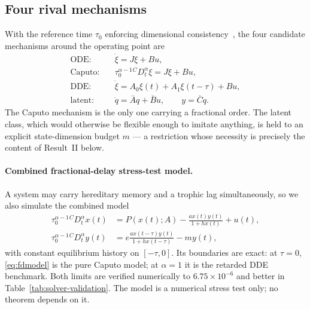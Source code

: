 \subsection{Four rival mechanisms}
With the reference time $\tau_0$ enforcing dimensional consistency~\cite{F02,F03,F04}, the four candidate mechanisms around the operating point are
\begin{align*}
\text{ODE:}&\quad \dot\xi=J\xi+Bu,\\
\text{Caputo:}&\quad \tau_0^{\alpha-1}{}^CD_t^\alpha\xi=J\xi+Bu,\\
\text{DDE:}&\quad \dot\xi=A_0\xi(t)+A_1\xi(t-\tau)+Bu,\\
\text{latent:}&\quad \dot q=\bar A q+\bar Bu,\qquad y=\bar Cq.
\end{align*}
The Caputo mechanism is the only one carrying a fractional order. The latent class, which would otherwise be flexible enough to imitate anything, is held to an explicit state-dimension budget $m$ --- a restriction whose necessity is precisely the content of Result~II below.

\paragraph{Combined fractional-delay stress-test model.}
A system may carry hereditary memory and a trophic lag simultaneously, so we also simulate the combined model
\begin{align}
\tau_0^{\alpha-1}{}^CD_t^\alpha x(t)
&=P(x(t);A)-\frac{a x(t)y(t)}{1+h x(t)}+u(t),\\
\tau_0^{\alpha-1}{}^CD_t^\alpha y(t)
&=e\frac{a x(t-\tau)y(t)}{1+h x(t-\tau)}-m y(t),
\label{eq:fdmodel}
\end{align}
with constant equilibrium history on $[-\tau,0]$. Its boundaries are exact: at $\tau=0$, \eqref{eq:fdmodel} is the pure Caputo model; at $\alpha=1$ it is the retarded DDE benchmark. Both limits are verified numerically to $6.75\times10^{-6}$ and better in Table~\ref{tab:solver-validation}. The model is a numerical stress test only; no theorem depends on it.
